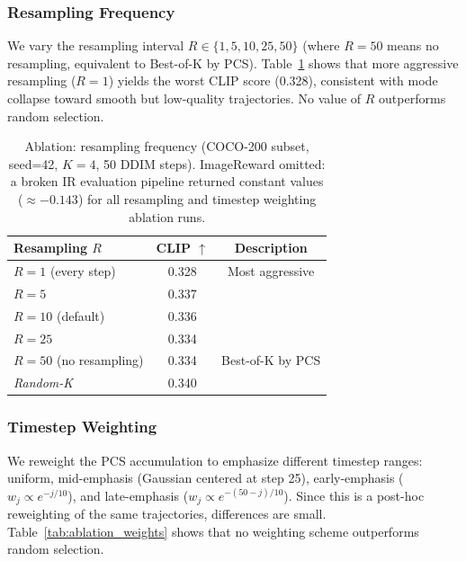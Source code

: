 \documentclass{article}
\newcommand{\pcs}{\textsc{PCS}}
\begin{document}
\subsubsection{Resampling Frequency}

We vary the resampling interval $R \in \{1, 5, 10, 25, 50\}$ (where $R=50$ means no resampling, equivalent to Best-of-K by \pcs{}). Table~\ref{tab:ablation_resample} shows that more aggressive resampling ($R=1$) yields the worst CLIP score (0.328), consistent with mode collapse toward smooth but low-quality trajectories. No value of $R$ outperforms random selection.

\begin{table}[t]
\centering
\caption{Ablation: resampling frequency (COCO-200 subset, seed=42, $K=4$, 50 DDIM steps). ImageReward omitted: a broken IR evaluation pipeline returned constant values ($\approx -0.143$) for all resampling and timestep weighting ablation runs.}
\label{tab:ablation_resample}
\small
\begin{tabular}{lcc}
\toprule
Resampling $R$ & CLIP $\uparrow$ & Description \\
\midrule
$R=1$ (every step) & 0.328 & Most aggressive \\
$R=5$ & 0.337 & \\
$R=10$ (default) & 0.336 & \\
$R=25$ & 0.334 & \\
$R=50$ (no resampling) & 0.334 & Best-of-K by \pcs{} \\
\midrule
\textit{Random-K} & 0.340 & \\
\bottomrule
\end{tabular}
\end{table}

\subsubsection{Timestep Weighting}

We reweight the \pcs{} accumulation to emphasize different timestep ranges: uniform, mid-emphasis (Gaussian centered at step 25), early-emphasis ($w_j \propto e^{-j/10}$), and late-emphasis ($w_j \propto e^{-(50-j)/10}$). Since this is a post-hoc reweighting of the same trajectories, differences are small. Table~\ref{tab:ablation_weights} shows that no weighting scheme outperforms random selection.
\end{document}
